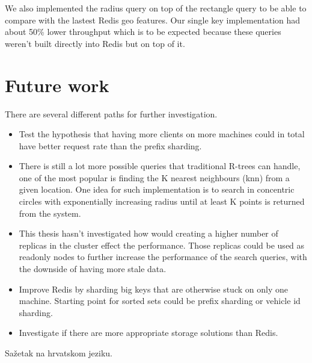 \documentclass[times, utf8, diplomski]{fer}
\begin{document}
We also implemented the radius query on top of the rectangle query to be able to compare with the lastest Redis geo features. Our single key implementation had about 50\% lower throughput which is to be expected because these queries weren't built directly into Redis but on top of it.

\section {Future work}
There are several different paths for further investigation.
\begin{itemize}
\item Test the hypothesis that having more clients on more machines could in total have better request rate than the prefix sharding.

\item There is still a lot more possible queries that traditional R-trees can handle, one of the most popular is finding the K nearest neighbours (knn) from a given location. One idea for such implementation is to search in concentric circles with exponentially increasing radius until at least K points is returned from the system.

\item This thesis hasn't investigated how would creating a higher number of replicas in the cluster effect the performance. Those replicas could be used as readonly nodes to further increase the performance of the search queries, with the downside of having more stale data.

\item Improve Redis by sharding big keys that are otherwise stuck on only one machine. Starting point for sorted sets could be prefix sharding or vehicle id sharding.

\item Investigate if there are more appropriate storage solutions than Redis.
\end{itemize}





















\begin{sazetak}
Sažetak na hrvatskom jeziku.

\end{sazetak}
\end{document}
